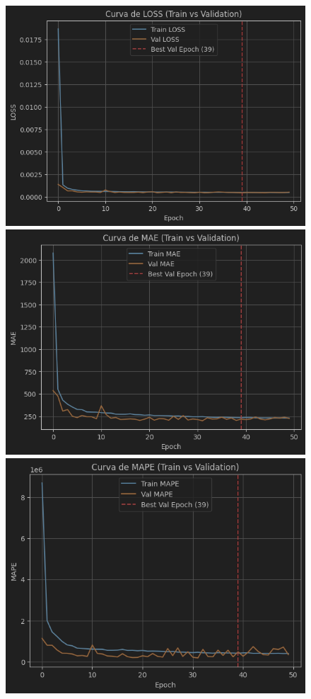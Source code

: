 \begin{figure}[H]
	\centering
	\begin{minipage}{0.48\textwidth}
		\centering
		\includegraphics[width=\linewidth]{includes/cap5/graphs/sid5_mlp_loss.png}
		\vspace{0.2cm}
		\includegraphics[width=\linewidth]{includes/cap5/graphs/sid5_mlp_mae.png}
		\vspace{0.2cm}
		\includegraphics[width=\linewidth]{includes/cap5/graphs/sid5_mlp_mape.png}

\end{minipage}
\end{figure}
